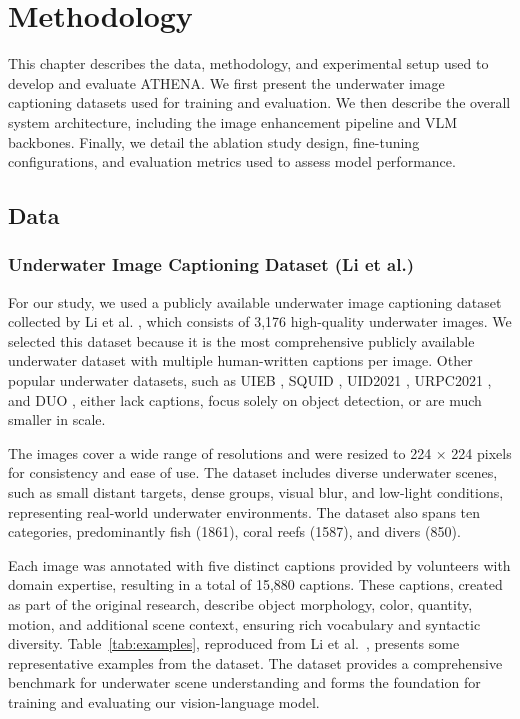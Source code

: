 \chapter{Methodology} \label{sec:matsmethods}
This chapter describes the data, methodology, and experimental setup used to develop and evaluate ATHENA. We first present the underwater image captioning datasets used for training and evaluation. We then describe the overall system architecture, including the image enhancement pipeline and VLM backbones. Finally, we detail the ablation study design, fine-tuning configurations, and evaluation metrics used to assess model performance.

\section{Data}
\subsection*{Underwater Image Captioning Dataset (Li et al.)}

For our study, we used a publicly available underwater image captioning
dataset collected by Li et al. \cite{mainref}, which consists of 3,176
high-quality underwater images. We selected this dataset because it is the most
comprehensive publicly available underwater dataset with multiple human-written
captions per image. Other popular underwater datasets, such as UIEB \cite{uieb},
SQUID \cite{squid}, UID2021 \cite{uid}, URPC2021 \cite{urpc}, and DUO
\cite{duo}, either lack captions, focus solely on object detection, or are much
smaller in scale.

The images cover a wide range of resolutions and were resized to 224 × 224 pixels for consistency and ease of use. The dataset includes diverse underwater scenes, such as small distant targets, dense groups, visual blur, and low-light conditions, representing real-world underwater environments. The dataset also spans ten categories, predominantly fish (1861), coral reefs (1587), and divers (850).

Each image was annotated with five distinct captions provided by volunteers with domain expertise, resulting in a total of 15,880 captions. These captions, created as part of the original research, describe object morphology, color, quantity, motion, and additional scene context, ensuring rich vocabulary and syntactic diversity. Table~\ref{tab:examples}, reproduced from Li et al.~\cite{mainref}, presents some representative examples from the dataset.  The dataset provides a comprehensive benchmark for underwater scene understanding and forms the foundation for training and evaluating our vision-language model.

